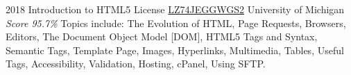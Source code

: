 \documentclass[11pt,a4paper]{moderncv}
\begin{document}
\cventry
    {2018}
    {Introduction to HTML5}
    {License
        \href{https://www.coursera.org/account/accomplishments/records/LZ74JEGGWGS2}
        {LZ74JEGGWGS2}
    }
    {University of Michigan}
    {\textit{Score 95.7\%}}
    {
        Topics include:                                                          %
            The Evolution of HTML,                                                          %
            Page Requests,                                                          %
            Browsers,                                                          %
            Editors,                                                          %
            The Document Object Model [DOM],                                                          %
            HTML5 Tags and Syntax,                                                          %
            Semantic Tags,                                                          %
            Template Page,                                                          %
            Images,                                                          %
            Hyperlinks,                                                          %
            Multimedia,                                                          %
            Tables,                                                          %
            Useful Tags,                                                          %
            Accessibility,                                                          %
            Validation,                                                          %
            Hosting,                                                          %
            cPanel,                                                          %
            Using SFTP.                                                          %
    }
\end{document}
